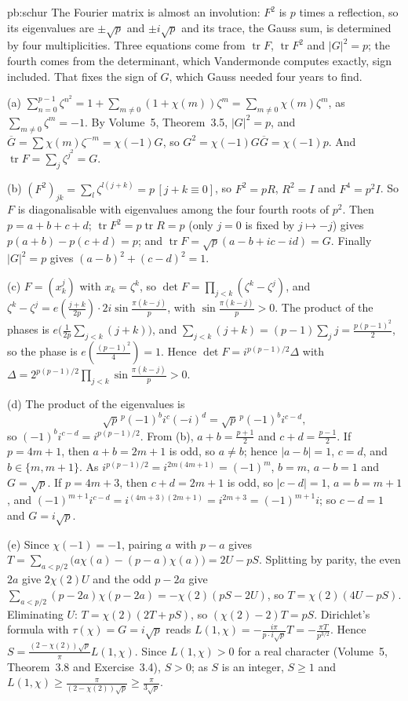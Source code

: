 \begin{solution}{pb:schur}
\idea The Fourier matrix is almost an involution: $F^2$ is $p$ times a reflection, so its eigenvalues are $\pm\sqrt p$ and $\pm i\sqrt p$ and its trace, the Gauss sum, is determined by
four multiplicities. Three equations come from $\operatorname{tr}F$, $\operatorname{tr}F^2$ and $|G|^2=p$; the fourth comes from the determinant, which Vandermonde computes exactly,
sign included. That fixes the sign of $G$, which Gauss needed four years to find.

\writeup (a) $\sum_{n=0}^{p-1}\zeta^{n^2}=1+\sum_{m\ne0}(1+\chi(m))\zeta^m=\sum_{m\ne0}\chi(m)\zeta^m$, as $\sum_{m\ne0}\zeta^m=-1$. By Volume~5, Theorem~3.5, $|G|^2=p$, and
$\overline G=\sum\chi(m)\zeta^{-m}=\chi(-1)G$, so $G^2=\chi(-1)G\overline G=\chi(-1)p$. And $\operatorname{tr}F=\sum_j\zeta^{j^2}=G$.

(b) $(F^2)_{jk}=\sum_l\zeta^{l(j+k)}=p\,[j+k\equiv0]$, so $F^2=pR$, $R^2=I$ and $F^4=p^2I$. So $F$ is diagonalisable with eigenvalues among the four fourth roots of $p^2$. Then
$p=a+b+c+d$; $\operatorname{tr}F^2=p\operatorname{tr}R=p$ (only $j=0$ is fixed by $j\mapsto-j$) gives $p(a+b)-p(c+d)=p$; and $\operatorname{tr}F=\sqrt p(a-b+ic-id)=G$. Finally
$|G|^2=p$ gives $(a-b)^2+(c-d)^2=1$.

(c) $F=(x_k^j)$ with $x_k=\zeta^k$, so $\det F=\prod_{j<k}(\zeta^k-\zeta^j)$, and $\zeta^k-\zeta^j=e(\frac{j+k}{2p})\cdot2i\sin\frac{\pi(k-j)}p$, with $\sin\frac{\pi(k-j)}p>0$. The
product of the phases is $e\bigl(\frac1{2p}\sum_{j<k}(j+k)\bigr)$, and $\sum_{j<k}(j+k)=(p-1)\sum_jj=\frac{p(p-1)^2}2$, so the phase is $e(\frac{(p-1)^2}4)=1$. Hence
$\det F=i^{p(p-1)/2}\Delta$ with $\Delta=2^{p(p-1)/2}\prod_{j<k}\sin\frac{\pi(k-j)}p>0$.

(d) The product of the eigenvalues is
\[
\sqrt p^{\,p}(-1)^bi^c(-i)^d=\sqrt p^{\,p}(-1)^bi^{c-d},
\]
so $(-1)^bi^{c-d}=i^{p(p-1)/2}$. From (b), $a+b=\frac{p+1}2$ and $c+d=\frac{p-1}2$.
If $p=4m+1$, then $a+b=2m+1$ is odd, so $a\ne b$; hence $|a-b|=1$, $c=d$, and $b\in\{m,m+1\}$. As $i^{p(p-1)/2}=i^{2m(4m+1)}=(-1)^m$, $b=m$, $a-b=1$ and $G=\sqrt p$. If $p=4m+3$,
then $c+d=2m+1$ is odd, so $|c-d|=1$, $a=b=m+1$, and $(-1)^{m+1}i^{c-d}=i^{(4m+3)(2m+1)}=i^{2m+3}=(-1)^{m+1}i$; so $c-d=1$ and $G=i\sqrt p$.

(e) Since $\chi(-1)=-1$, pairing $a$ with $p-a$ gives $T=\sum_{a<p/2}\bigl(a\chi(a)-(p-a)\chi(a)\bigr)=2U-pS$. Splitting by parity, the even $2a$ give $2\chi(2)U$ and the odd
$p-2a$ give $\sum_{a<p/2}(p-2a)\chi(p-2a)=-\chi(2)(pS-2U)$, so $T=\chi(2)(4U-pS)$. Eliminating $U$: $T=\chi(2)(2T+pS)$, so $(\chi(2)-2)T=pS$. Dirichlet's formula with
$\tau(\chi)=G=i\sqrt p$ reads $L(1,\chi)=-\frac{i\pi}{p\cdot i\sqrt p}T=-\frac{\pi T}{p^{3/2}}$. Hence $S=\frac{(2-\chi(2))\sqrt p}\pi L(1,\chi)$. Since $L(1,\chi)>0$ for a real character
(Volume~5, Theorem~3.8 and Exercise~3.4), $S>0$; as $S$ is an integer, $S\ge1$ and $L(1,\chi)\ge\frac\pi{(2-\chi(2))\sqrt p}\ge\frac\pi{3\sqrt p}$.


\end{solution}
